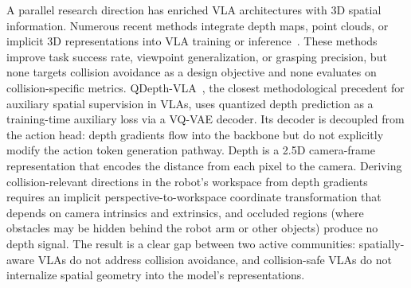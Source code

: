 A parallel research direction has enriched VLA architectures with 3D spatial information. Numerous recent methods integrate depth maps, point clouds, or implicit 3D representations into VLA training or inference~\cite{depthvla2025, li2025qdepth, li2025spatialforcing, 3dcavla2025, geoaware2025, spatialvla2025, gstvla2026, stemvla2026, stvla2026, evo02025, savla2026, augvla3d2026, evodepth2026}. These methods improve task success rate, viewpoint generalization, or grasping precision, but none targets collision avoidance as a design objective and none evaluates on collision-specific metrics. QDepth-VLA~\cite{li2025qdepth}, the closest methodological precedent for auxiliary spatial supervision in VLAs, uses quantized depth prediction as a training-time auxiliary loss via a VQ-VAE decoder. Its decoder is decoupled from the action head: depth gradients flow into the backbone but do not explicitly modify the action token generation pathway. Depth is a 2.5D camera-frame representation that encodes the distance from each pixel to the camera. Deriving collision-relevant directions in the robot's workspace from depth gradients requires an implicit perspective-to-workspace coordinate transformation that depends on camera intrinsics and extrinsics, and occluded regions (where obstacles may be hidden behind the robot arm or other objects) produce no depth signal. The result is a clear gap between two active communities: spatially-aware VLAs do not address collision avoidance, and collision-safe VLAs do not internalize spatial geometry into the model's representations.

